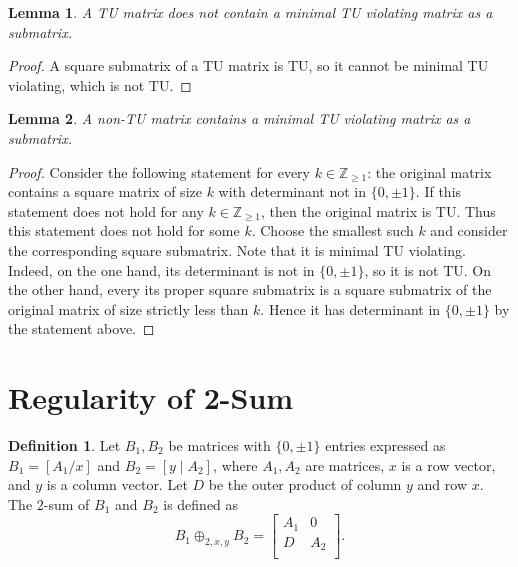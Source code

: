 \documentclass{article}
\newtheorem{lemma}{Lemma}
\theoremstyle{definition}
\newtheorem{definition}{Definition}
\begin{document}
\begin{lemma}
    A TU matrix does not contain a minimal TU violating matrix as a submatrix.
\end{lemma}

\begin{proof}
    A square submatrix of a TU matrix is TU, so it cannot be minimal TU violating, which is not TU.
\end{proof}

\begin{lemma}
    A non-TU matrix contains a minimal TU violating matrix as a submatrix.
\end{lemma}

\begin{proof}
    Consider the following statement for every $k \in \mathbb{Z}_{\geq 1}$: the original matrix contains a square matrix of size $k$ with determinant not in $\{0, \pm 1\}$. If this statement does not hold for any $k \in \mathbb{Z}_{\geq 1}$, then the original matrix is TU. Thus this statement does not hold for some $k$. Choose the smallest such $k$ and consider the corresponding square submatrix. Note that it is minimal TU violating. Indeed, on the one hand, its determinant is not in $\{0, \pm 1\}$, so it is not TU. On the other hand, every its proper square submatrix is a square submatrix of the original matrix of size strictly less than $k$. Hence it has determinant in $\{0, \pm 1\}$ by the statement above.
\end{proof}


\section{Regularity of 2-Sum}

\begin{definition}\label{def:two_sum}
    Let $B_{1}, B_{2}$ be matrices with $\{0, \pm 1\}$ entries expressed as $B_{1} = \left[A_{1} / x\right]$ and $B_{2} = \left[y \mid A_{2}\right]$, where $A_{1}, A_{2}$ are matrices, $x$ is a row vector, and $y$ is a column vector. Let $D$ be the outer product of column $y$ and row $x$. The $2$-sum of $B_{1}$ and $B_{2}$ is defined as
    \[
        B_{1} \oplus_{2, x, y} B_{2} = \begin{bmatrix}
            A_{1} & 0 \\
            D & A_{2} \\
        \end{bmatrix}.
    \]
\end{definition}
\end{document}
